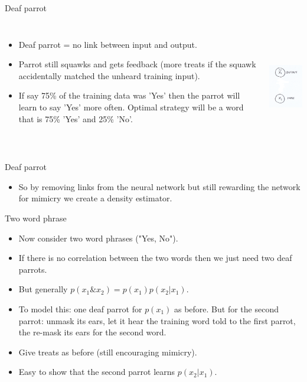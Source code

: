 \documentclass[usenames,dvipsnames]{beamer}
\begin{document}
\begin{frame}{Deaf parrot}
	\begin{columns}
    \begin{itemize}
      \item{Deaf parrot = no link between input and output.}
	\item{Parrot still squawks and gets feedback (more treats if the squawk accidentally matched the unheard training input).}
	\item{If say 75\% of the training data was 'Yes' then the parrot will learn to say 'Yes' more often. Optimal strategy will be a word that is 75\% 'Yes' and 25\% 'No'.}
    \end{itemize}
             \centering
             \includegraphics[height=5cm, width=3.5cm]{image_02}
         \end{columns} 
\end{frame}

\begin{frame}{Deaf parrot}
    \begin{itemize}
      \item{So by removing links from the neural network but still rewarding the network for mimicry we create a density estimator.}
    \end{itemize}
\end{frame}

\begin{frame}{Two word phrase}
    \begin{itemize}
      \item{Now consider two word phrases ("Yes, No").}
	\item{If there is no correlation between the two words then we just need two deaf parrots.}
	\item{But generally $p(x_1 \& x_2) = p(x_1) p(x_2 | x_1)$.}
	\item{To model this: one deaf parrot for $p(x_1)$ as before. But for the second parrot: unmask its ears, let it hear the training word told to the first parrot, the re-mask its ears for the second word.}
	\item{Give treats as before (still encouraging mimicry).}
	\item{Easy to show that the second parrot learns $p(x_2 | x_1)$.}
    \end{itemize}
\end{frame}
\end{document}
